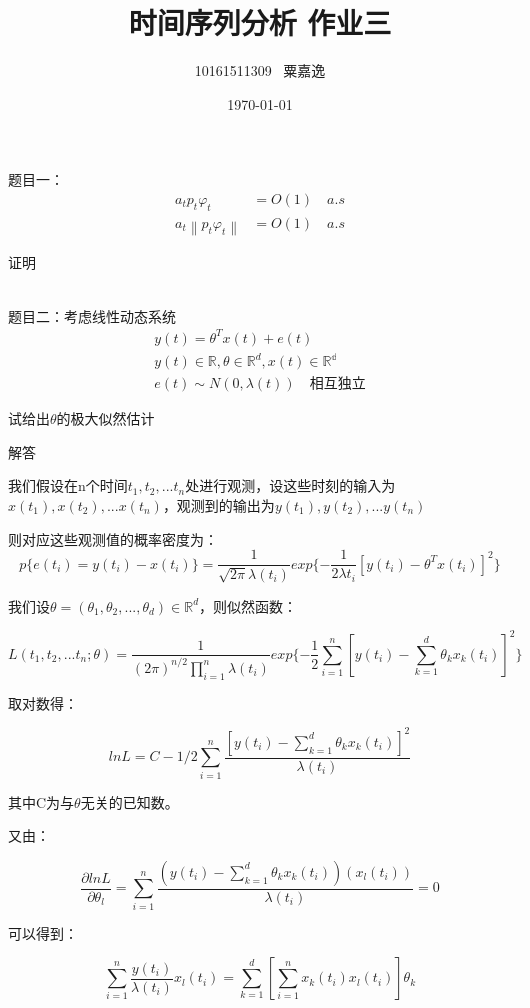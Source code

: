 \documentclass[12pt, a4paper]{ctexart}
\title{时间序列分析 作业三}
\author{10161511309 \, 粟嘉逸}
\date{\today}
\begin{document}
\maketitle{}

\begin{flushleft}
	\qquad 题目一：
		\begin{align*}
			a_tp_t\varphi_t&=O(1) \quad a.s\\
			a_t\left\| p_t\varphi_t\right\| &=O(1) \quad a.s
		\end{align*}

	\qquad 证明
	
		
		~\\	
	\qquad 题目二：考虑线性动态系统
		\begin{gather*}
			y(t)=\theta^{T}x(t)+e(t)\\
			y(t)\in \mathbb{R},\theta\in \mathbb{R}^d,x(t)\in \mathbb{R^d}\\
			e(t)\sim N(0,\lambda(t)) \quad \mbox{相互独立}
		\end{gather*}
		
	\qquad 试给出$\theta$的极大似然估计
	
    \qquad 解答
    
    我们假设在n个时间$t_1,t_2,...t_n$处进行观测，设这些时刻的输入为$x(t_1),x(t_2),...x(t_n)$，观测到的输出为$y(t_1),y(t_2),...y(t_n)$

    则对应这些观测值的概率密度为：
    \[
        p\{e(t_i)=y(t_i)-x(t_i)\}=\dfrac{1}{\sqrt{2\pi}\lambda(t_i)}exp\{-\frac{1}{2\lambda{t_i}}[y(t_i)-\theta^Tx(t_i)]^2\}
    \]

    我们设$\theta = (\theta_1,\theta_2,...,\theta_d) \in \mathbb{R}^d$，则似然函数：

    \[
        L(t_1,t_2,...t_n;\theta) = \dfrac{1}{{(2\pi)}^{n/2}\prod_{i=1}^n\lambda(t_i)}exp\{-\frac{1}{2}\sum_{i=1}^n[y(t_i)-\sum_{k=1}^d{\theta_kx_k(t_i)}]^2\}
    \]

    取对数得：

    \[
        ln L = C - 1/2 \sum^n_{i=1}\dfrac{[y(t_i)-\sum_{k=1}^d{\theta_kx_k(t_i)}]^2}{\lambda(t_i)}
    \]

    其中C为与$\theta$无关的已知数。

    又由：

    \[
        \dfrac{\partial lnL}{\partial \theta_l} = \sum^n_{i=1}\dfrac{(y(t_i)-\sum_{k=1}^d\theta_kx_k(t_i))(x_l(t_i))}{\lambda(t_i)}=0
    \]

    可以得到：

    \[
        \sum_{i=1}^n \dfrac{y(t_i)}{\lambda(t_i)} x_l(t_i) = \sum_{k=1}^d[\sum_{i=1}^nx_k(t_i)x_l(t_i)]\theta_k
    \]


\end{flushleft}
\end{document}
